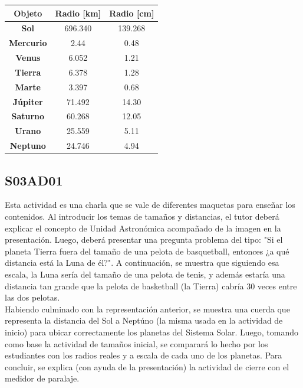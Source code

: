 \documentclass[10pt,a4paper]{article}
\begin{document}
\begin{table}[H]
\begin{tabular}{|c|c|c|}
\hline
\textbf{Objeto}   & \textbf{Radio {[}km{]}}                               & \textbf{Radio {[}cm{]}} \\ \hline
\textbf{Sol}      & 696.340                                               & 139.268                 \\ \hline
\textbf{Mercurio} &  2.44  & 0.48                    \\ \hline
\textbf{Venus}    & 6.052  & 1.21           \\ \hline
\textbf{Tierra}   & 6.378                                                 & 1.28                    \\ \hline
\textbf{Marte}    & 3.397   & 0.68                    \\ \hline
\textbf{Júpiter}  &  71.492 & 14.30            \\ \hline
\textbf{Saturno}  &60.268 & 12.05       \\ \hline
\textbf{Urano}    & 25.559                                                & 5.11                    \\ \hline
\textbf{Neptuno}  & 24.746                                                & 4.94                    \\ \hline
\end{tabular}
\end{table}

\subsection{S03AD01}
Esta actividad es una charla que se vale de diferentes maquetas para enseñar los contenidos. Al introducir los temas de tamaños y distancias, el tutor deberá explicar el concepto de Unidad Astronómica acompañado de la imagen en la presentación. Luego, deberá presentar una pregunta problema del tipo: "Si el planeta Tierra fuera del tamaño de una pelota de basquetball, entonces ¿a qué distancia está la Luna de él?". A continuación, se muestra que siguiendo esa escala, la Luna sería del tamaño de una pelota de tenis, y además estaría una distancia tan grande que la pelota de basketball (la Tierra) cabría 30 veces entre las dos pelotas. \\

Habiendo culminado con la representación anterior, se muestra una cuerda que representa la distancia del Sol a Neptúno (la misma usada en la actividad de inicio) para ubicar correctamente los planetas del Sistema Solar. Luego, tomando como base la actividad de tamaños inicial, se comparará lo hecho por los estudiantes con los radios reales y a escala de cada uno de los planetas. Para concluir, se explica (con ayuda de la presentación) la actividad de cierre con el medidor de paralaje.
\end{document}
